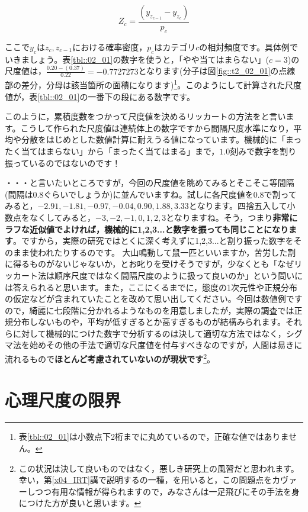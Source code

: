 \documentclass{ltjsbook}
\begin{document}
\[ Z_c = \frac{(y_{z_{c-1}} - y_{z_c})}{p_c} \]

ここで$y_c$は$z_c,z_{c-1}$における確率密度，$p_c$はカテゴリ$c$の相対頻度です。具体例でいきましょう。表\ref{tbl::02_01}の数字を使うと，「やや当てはまらない」($c=3$)の尺度値は，$\frac{0.20-(0.37)}{0.22}=-0.7727273$となります(分子は図\ref{fig::t2_02_01}の点線部の差分，分母は該当箇所の面積になります)\footnote{表\ref{tbl::02_01}は小数点下2桁までに丸めているので，正確な値ではありません。}。このようにして計算された尺度値が，表\ref{tbl::02_01}の一番下の段にある数字です。

このように，累積度数をつかって尺度値を決めるリッカートの方法をと言います。こうして作られた尺度値は連続体上の数字ですから間隔尺度水準になり，平均や分散をはじめとした数値計算に耐えうる値になっています。機械的に「まったく当てはまらない」から「まったく当てはまる」まで，$1.0$刻みで数字を割り振っているのではないのです！


・・・と言いたいところですが，今回の尺度値を眺めてみるとそこそこ等間隔(間隔は$0.8$ぐらいでしょうか)に並んでいますね。試しに各尺度値を0.8で割ってみると，$-2.91,-1.81,-0.97, -0.04,0.90, 1.88, 3.33$となります。四捨五入して小数点をなくしてみると，$-3,-2,-1,0,1,2,3$となりますね。そう，つまり\textbf{非常にラフな近似値でよければ，機械的に1,2,3...と数字を振っても同じことになります}。ですから，実際の研究ではとくに深く考えずに1,2,3...と割り振った数字をそのまま使われたりするのです。
大山鳴動して鼠一匹といいますか，苦労した割に得るものがないじゃないか，とお叱りを受けそうですが，少なくとも「なぜリッカート法は順序尺度ではなく間隔尺度のように扱って良いのか」という問いには答えられると思います。また，ここにくるまでに，態度の1次元性や正規分布の仮定などが含まれていたことを改めて思い出してください。今回は数値例ですので，綺麗に七段階に分かれるようなものを用意しましたが，実際の調査では正規分布しないものや，平均が低すぎるとか高すぎるものが結構みられます。それらに対して機械的につけた数字で分析するのは決して適切な方法ではなく，シグマ法を始めその他の手法で適切な尺度値を付与すべきなのですが，人間は易きに流れるもので\textbf{ほとんど考慮されていないのが現状です}\footnote{この状況は決して良いものではなく，悪しき研究上の風習だと思われます。幸い，第\ref{x04_IRT}講で説明するの一種，を用いると，この問題点をカヴァーしつつ有用な情報が得られますので，みなさんは一足飛びにその手法を身につけた方が良いと思います。}。

\section{心理尺度の限界}
\end{document}

